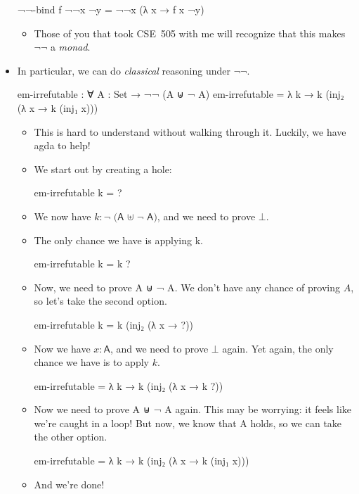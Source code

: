 \documentclass{lecturenotes}
\begin{document}
\begin{itemize}
\begin{code}
¬¬-bind f ¬¬x ¬y = ¬¬x (λ {x → f x ¬y})    
\end{code}
\begin{itemize}
\item Those of you that took CSE~505 with me will recognize that this makes $\mathord{\lnot}\mathord{\lnot}$ a \emph{monad}.
\end{itemize}
\newpage
\item In particular, we can do \emph{classical} reasoning under $\mathord{\lnot}\mathord{\lnot}$.
\begin{code}
em-irrefutable : ∀ {A : Set} → ¬¬ (A ⊎ ¬ A)
em-irrefutable = λ {k → k (inj₂ (λ {x → k (inj₁ x)}))}
\end{code}
  \begin{itemize}
  \item This is hard to understand without walking through it.
    Luckily, we have agda to help!
  \item We start out by creating a hole:

    \begin{center}\textsf{em-irrefutable k = ?}\end{center}
  \item We now have $k \colon \textsf{¬ (A ⊎ ¬ A)}$, and we need to prove $\bot$.
  \item The only chance we have is applying \textsf{k}.

    \begin{center}\textsf{em-irrefutable k = k ?}\end{center}
  \item Now, we need to prove \textsf{A ⊎ ¬ A}.
    We don't have any chance of proving $A$, so let's take the second option.

    \begin{center}\textsf{em-irrefutable k = k (inj₂ (λ {x → ?}))}\end{center}
  \item Now we have $x \colon \textsf{A}$, and we need to prove $\bot$ again.
    Yet again, the only chance we have is to apply $k$.

    \begin{center}\textsf{em-irrefutable = λ {k → k (inj₂ (λ {x → k ?}))}}\end{center}
  \item Now we need to prove \textsf{A ⊎ ¬ A} again.
    This may be worrying: it feels like we're caught in a loop!
    But now, we know that \textsf{A} holds, so we can take the other option.

    \begin{center}\textsf{em-irrefutable = λ {k → k (inj₂ (λ {x → k (inj₁ x)}))}}\end{center}
  \item And we're done!
  \end{itemize}
\end{itemize}
\end{document}
